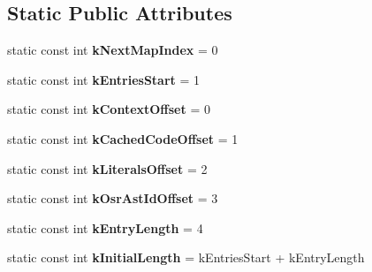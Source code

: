 \subsection*{Static Public Attributes}
\begin{DoxyCompactItemize}
\item 
\hypertarget{classv8_1_1internal_1_1_shared_function_info_a707343d9d4256790c2edf5f52b8c2c15}{}static const int {\bfseries k\+Next\+Map\+Index} = 0\label{classv8_1_1internal_1_1_shared_function_info_a707343d9d4256790c2edf5f52b8c2c15}

\item 
\hypertarget{classv8_1_1internal_1_1_shared_function_info_a729064902568c99387215e69f5dcbfc3}{}static const int {\bfseries k\+Entries\+Start} = 1\label{classv8_1_1internal_1_1_shared_function_info_a729064902568c99387215e69f5dcbfc3}

\item 
\hypertarget{classv8_1_1internal_1_1_shared_function_info_ae457da58033018f41b8300f61a4961d7}{}static const int {\bfseries k\+Context\+Offset} = 0\label{classv8_1_1internal_1_1_shared_function_info_ae457da58033018f41b8300f61a4961d7}

\item 
\hypertarget{classv8_1_1internal_1_1_shared_function_info_a0d13a7375ce7bdd5590a7ace53e7515d}{}static const int {\bfseries k\+Cached\+Code\+Offset} = 1\label{classv8_1_1internal_1_1_shared_function_info_a0d13a7375ce7bdd5590a7ace53e7515d}

\item 
\hypertarget{classv8_1_1internal_1_1_shared_function_info_a934cd80fb656740d9f0c0659c22cb871}{}static const int {\bfseries k\+Literals\+Offset} = 2\label{classv8_1_1internal_1_1_shared_function_info_a934cd80fb656740d9f0c0659c22cb871}

\item 
\hypertarget{classv8_1_1internal_1_1_shared_function_info_a74bdd08a7609ba70b459aa7fd09cd30e}{}static const int {\bfseries k\+Osr\+Ast\+Id\+Offset} = 3\label{classv8_1_1internal_1_1_shared_function_info_a74bdd08a7609ba70b459aa7fd09cd30e}

\item 
\hypertarget{classv8_1_1internal_1_1_shared_function_info_ae6a1d8883ff11916d52d1b13b0c6a41d}{}static const int {\bfseries k\+Entry\+Length} = 4\label{classv8_1_1internal_1_1_shared_function_info_ae6a1d8883ff11916d52d1b13b0c6a41d}

\item 
\hypertarget{classv8_1_1internal_1_1_shared_function_info_aaf4511ccafdd97f715e55e7e8cf8a967}{}static const int {\bfseries k\+Initial\+Length} = k\+Entries\+Start + k\+Entry\+Length\label{classv8_1_1internal_1_1_shared_function_info_aaf4511ccafdd97f715e55e7e8cf8a967}


\end{DoxyCompactItemize}
